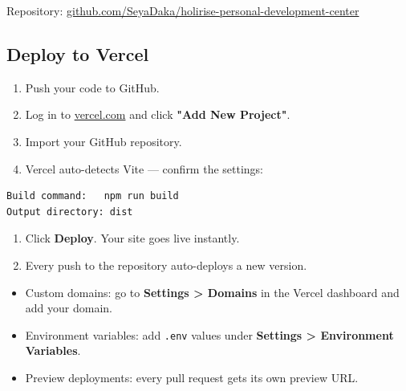 \documentclass[11pt,a4paper]{article}
\begin{document}
\begin{notebox}
Repository: \href{https://github.com/SeyaDaka/holirise-personal-development-center}{github.com/SeyaDaka/holirise-personal-development-center}
\end{notebox}

\subsection{Deploy to Vercel}

\begin{enumerate}[leftmargin=*, label=\textcolor{accent}{\arabic*.}]
    \item Push your code to GitHub.
    \item Log in to \href{https://vercel.com}{vercel.com} and click
          \textbf{"Add New Project"}.
    \item Import your GitHub repository.
    \item Vercel auto-detects Vite --- confirm the settings:
\end{enumerate}

\begin{codebox}
\begin{lstlisting}
Build command:   npm run build
Output directory: dist
\end{lstlisting}
\end{codebox}

\begin{enumerate}[leftmargin=*, label=\textcolor{accent}{\arabic*.}, start=5]
    \item Click \textbf{Deploy}.  Your site goes live instantly.
    \item Every push to the repository auto-deploys a new version.
\end{enumerate}

\begin{tipbox}
\begin{itemize}[leftmargin=*, label=\textcolor{success}{$\bullet$}]
    \item Custom domains: go to \textbf{Settings > Domains} in the
          Vercel dashboard and add your domain.
    \item Environment variables: add \texttt{.env} values under
          \textbf{Settings > Environment Variables}.
    \item Preview deployments: every pull request gets its own preview URL.
\end{itemize}
\end{tipbox}
\end{document}
